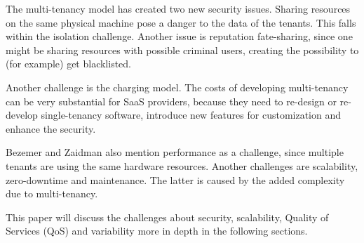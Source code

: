 The multi-tenancy model has created two new security issues\cite{dillon2010cloud}. Sharing resources on the same physical machine pose a danger to the data of the tenants. This falls within the isolation challenge. Another issue is reputation fate-sharing, since one might be sharing resources with possible criminal users, creating the possibility to (for example) get blacklisted.

Another challenge is the charging model. The costs of developing multi-tenancy can be very substantial for SaaS providers, because they need to re-design or re-develop single-tenancy software, introduce new features for customization and enhance the security.

Bezemer and Zaidman\cite{bezemer2010multi} also mention performance as a challenge, since multiple tenants are using the same hardware resources. Another challenges are scalability, zero-downtime and maintenance. The latter is caused by the added complexity due to multi-tenancy.

This paper will discuss the challenges about security, scalability, Quality of Services (QoS) and variability more in depth in the following sections.